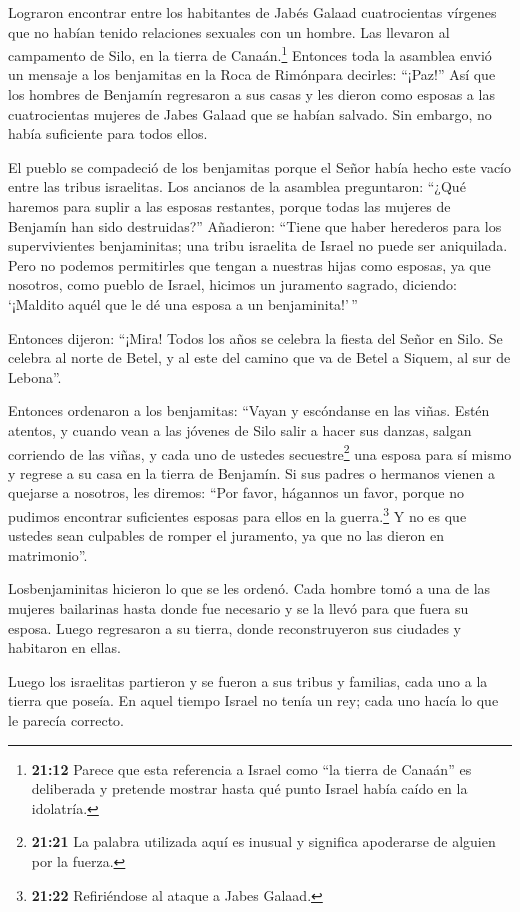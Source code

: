 Lograron encontrar entre los habitantes de Jabés Galaad
cuatrocientas vírgenes que no habían tenido relaciones sexuales con un
hombre. Las llevaron al campamento de Silo, en la tierra de
Canaán.\footnote{\textbf{21:12} Parece que esta referencia a Israel como
  ``la tierra de Canaán'' es deliberada y pretende mostrar hasta qué
  punto Israel había caído en la idolatría.}  Entonces toda
la asamblea envió un mensaje a los benjamitas en la Roca de Rimónpara
decirles: ``¡Paz!''  Así que los hombres de Benjamín
regresaron a sus casas y les dieron como esposas a las cuatrocientas
mujeres de Jabes Galaad que se habían salvado. Sin embargo, no había
suficiente para todos ellos.

 El pueblo se compadeció de los benjamitas porque el Señor
había hecho este vacío entre las tribus israelitas.  Los
ancianos de la asamblea preguntaron: ``¿Qué haremos para suplir a las
esposas restantes, porque todas las mujeres de Benjamín han sido
destruidas?''  Añadieron: ``Tiene que haber herederos para
los supervivientes benjaminitas; una tribu israelita de Israel no puede
ser aniquilada.  Pero no podemos permitirles que tengan a
nuestras hijas como esposas, ya que nosotros, como pueblo de Israel,
hicimos un juramento sagrado, diciendo: `¡Maldito aquél que le dé una
esposa a un benjaminita!'\,''

 Entonces dijeron: ``¡Mira! Todos los años se celebra la
fiesta del Señor en Silo. Se celebra al norte de Betel, y al este del
camino que va de Betel a Siquem, al sur de Lebona''.

 Entonces ordenaron a los benjamitas: ``Vayan y escóndanse
en las viñas.  Estén atentos, y cuando vean a las jóvenes
de Silo salir a hacer sus danzas, salgan corriendo de las viñas, y cada
uno de ustedes secuestre\footnote{\textbf{21:21} La palabra utilizada
  aquí es inusual y significa apoderarse de alguien por la fuerza.} una
esposa para sí mismo y regrese a su casa en la tierra de Benjamín.
 Si sus padres o hermanos vienen a quejarse a nosotros, les
diremos: ``Por favor, hágannos un favor, porque no pudimos encontrar
suficientes esposas para ellos en la guerra.\footnote{\textbf{21:22}
  Refiriéndose al ataque a Jabes Galaad.} Y no es que ustedes sean
culpables de romper el juramento, ya que no las dieron en matrimonio''.

 Losbenjaminitas hicieron lo que se les ordenó. Cada hombre
tomó a una de las mujeres bailarinas hasta donde fue necesario y se la
llevó para que fuera su esposa. Luego regresaron a su tierra, donde
reconstruyeron sus ciudades y habitaron en ellas.

 Luego los israelitas partieron y se fueron a sus tribus y
familias, cada uno a la tierra que poseía.  En aquel tiempo
Israel no tenía un rey; cada uno hacía lo que le parecía correcto.
